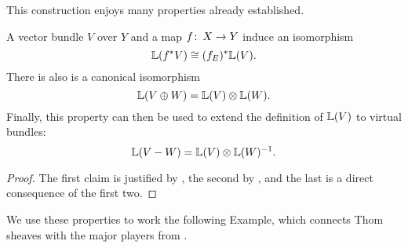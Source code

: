 This construction enjoys many properties already established.
\begin{corollary}\label{PropertiesOfThomSheaves}
A vector bundle $V$ over $Y$ and a map $f \colon\thinspace X \to Y$ induce an isomorphism \[\mathbb{L}(f^* V) \cong (f_E)^* \mathbb{L}(V).\]  There is also is a canonical isomorphism \[\mathbb{L}(V \oplus W) = \mathbb{L}(V) \otimes \mathbb{L}(W).\]  Finally, this property can then be used to extend the definition of $\mathbb{L}(V)$ to virtual bundles: \[\mathbb{L}(V - W) = \mathbb{L}(V) \otimes \mathbb{L}(W)^{-1}.\]
\end{corollary}
\begin{proof}
The first claim is justified by , the second by , and the last is a direct consequence of the first two.
\end{proof}

We use these properties to work the following Example, which connects Thom sheaves with the major players from .


